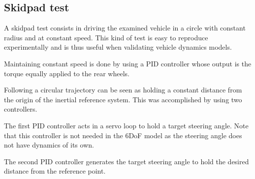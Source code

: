 \subsection{Skidpad test}
A skidpad test consists in driving the examined vehicle in a circle with constant radius and at constant speed. This kind of test is easy to reproduce experimentally and is thus useful when validating vehicle dynamics models.

Maintaining constant speed is done by using a PID controller whose output is the torque equally applied to the rear wheels.

Following a circular trajectory can be seen as holding a constant distance from the origin of the inertial reference system. This was accomplished by using two controllers.

The first PID controller acts in a servo loop to hold a target steering angle.
Note that this controller is not needed in the 6DoF model as the steering angle does not have dynamics of its own.

The second PID controller generates the target steering angle to hold the desired distance from the reference point.
